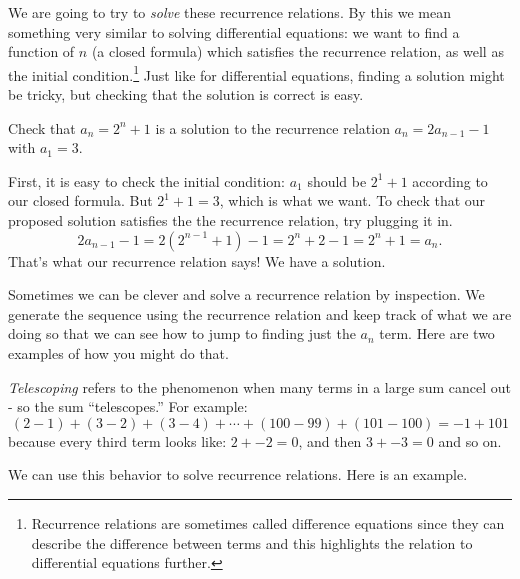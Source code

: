 \documentclass[12pt]{article}
\begin{document}
 
We are going to try to {\em solve} these recurrence relations.  By this we mean something very similar to solving differential equations: we want to find a function of $n$ (a closed formula) which satisfies the recurrence relation, as well as the initial condition.\footnote{Recurrence relations are sometimes called difference equations since they can describe the difference between terms and this highlights the relation to differential equations further.} Just like for differential equations, finding a solution might be tricky, but checking that the solution is correct is easy.
 
 \begin{example}
    Check that $a_n = 2^n + 1$ is a solution to the recurrence relation $a_n = 2a_{n-1} - 1$ with $a_1 = 3$. 
    \begin{solution}
      First, it is easy to check the initial condition: $a_1$ should be $2^1 + 1$ according to our closed formula.  But $2^1 + 1 = 3$, which is what we want.  To check that our proposed solution satisfies the the recurrence relation, try plugging it in.
      \[2a_{n-1} - 1 = 2(2^{n-1} + 1) - 1 = 2^n + 2 - 1 = 2^n +1 = a_n.\]
      That's what our recurrence relation says!  We have a solution.
    \end{solution}

 \end{example}

 

Sometimes we can be clever and solve a recurrence relation by inspection.  We generate the sequence using the recurrence relation and keep track of what we are doing so that we can see how to jump to finding just the $a_n$ term.  Here are two examples of how you might do that.
%

{\em Telescoping} refers to the phenomenon when many terms in a large sum cancel out - so the sum ``telescopes.''  For example:
\[(2 - 1) + (3 - 2) + (3 - 4) + \cdots + (100 - 99) + (101 - 100) = -1 + 101\]
because every third term looks like: $2 + -2 = 0$, and then $3 + -3 = 0$ and so on.

We can use this behavior to solve recurrence relations.  Here is an example.
\end{document}
